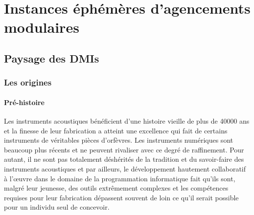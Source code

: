 %
\chapter{Instances éphémères d'agencements modulaires}
\label{ch:ephemeral}






\section{Paysage des DMIs}
\label{sec:ephemerality:landscape}


\subsection{Les origines}

\subsubsection{Pré-histoire}

Les instruments acoustiques bénéficient d'une histoire vieille de plus de 40000 ans et la finesse de leur fabrication a atteint une excellence qui fait de certains instruments de véritables pièces d'orfèvres. Les instruments numériques sont beaucoup plus récents et ne peuvent rivaliser avec ce degré de raffinement. Pour autant, il ne sont pas totalement déshérités de la tradition et du savoir-faire des instruments acoustiques et par ailleurs, le développement hautement collaboratif à l'œuvre dans le domaine de la programmation informatique fait qu'ils sont, malgré leur jeunesse, des outils extrêmement complexes et les compétences requises pour leur fabrication dépassent souvent de loin ce qu'il serait possible pour un individu seul de concevoir.

